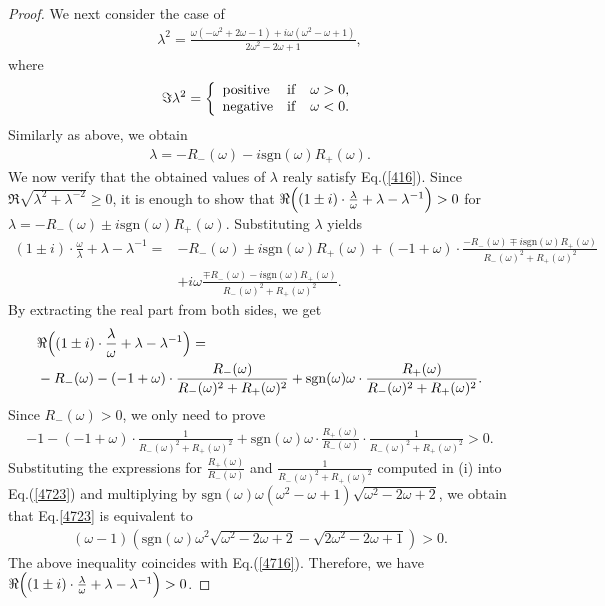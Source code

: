\documentclass[a4paper,12pt]{article}
\theoremstyle{plain}
\theoremstyle{definition}
\theoremstyle{definition}
\begin{document}
\begin{proof}
We next consider the case of 
\begin{align*}
\lambda ^2= \frac{\omega (-\omega ^2 +2\omega -1) + i\omega (\omega ^2 -\omega +1)}{2\omega ^2 -2\omega +1}, 
 \end{align*}
where 
\begin{eqnarray*}
\Im \lambda^2 = \left\{
\begin{array}{ll}
{\rm positive} &  {\rm if} \quad  \omega >0,\\
{\rm negative} & {\rm if} \quad \omega <0.
\end{array}
\right.
\end{eqnarray*}
Similarly as above, we obtain
\begin{align*}
    \lambda = -R_{-}(\omega)-i\mathrm{sgn}(\omega)R_{+}(\omega).
\end{align*}
We now verify that the obtained values of $\lambda$ realy satisfy Eq.(\ref{416}). Since $\Re \sqrt{\lambda^2 +\lambda^{-2}} \ge 0$, it is enough to show that $\Re \Bigl( (1\pm i) \cdot \frac{\lambda}{\omega}+\lambda -\lambda^{-1} \Bigr) > 0$ for $\lambda = -R_-(\omega) \pm i\mathrm{sgn}(\omega) R_+(\omega)$.
Substituting $\lambda$ yields
\begin{align*}
    (1 \pm i) \cdot \frac{\omega}{\lambda} +\lambda -\lambda^{-1} =& -R_{-}(\omega)\pm i\mathrm{sgn}(\omega)R_{+}(\omega)+(-1+\omega)\cdot \frac{-R_{-}(\omega)\mp i\mathrm{sgn}(\omega)R_{+}(\omega)}{R_-(\omega)^2+R_+(\omega)^2}\\
    &+i\omega\frac{\mp R_{-}(\omega)-i\mathrm{sgn}(\omega)R_{+}(\omega)}{R_-(\omega)^2+R_+(\omega)^2}.
\end{align*}
By extracting the real part from both sides, we get
\begin{align*}
    &\Re \Bigl( (1\pm i) \cdot \frac{\lambda}{\omega} +\lambda -\lambda^{-1} \Bigr) =\\
    &-R_-(\omega)-(-1+\omega)\cdot \frac{R_-(\omega)}{R_-(\omega)^2+R_+(\omega)^2}+\mathrm{sgn}(\omega)\omega\cdot  \frac{R_+(\omega)}{R_-(\omega)^2+R_+(\omega)^2}.
\end{align*}
Since $R_-(\omega)>0$, we only need to prove
\begin{align}
    -1-(-1+\omega)\cdot \frac{1}{R_-(\omega)^2+R_+(\omega)^2}+\mathrm{sgn}(\omega)\omega \cdot \frac{R_+(\omega)}{R_-(\omega)}\cdot  \frac{1}{R_-(\omega)^2+R_+(\omega)^2} > 0. \label{4723}
\end{align}
Substituting the expressions for $\frac{R_+(\omega)}{R_-(\omega)}$ and $\frac{1}{R_-(\omega)^2 + R_+(\omega)^2}$ computed in (i) into Eq.(\ref{4723}) and multiplying by 
$\mathrm{sgn}(\omega)\omega(\omega^2 - \omega + 1)\sqrt{\omega^2-2\omega+2}$,
we obtain that Eq.\eqref{4723} is equivalent to 
\begin{align*}
(\omega-1)(\mathrm{sgn}(\omega)\omega^2 \sqrt{\omega^2-2\omega +2} -\sqrt{2\omega^2-2\omega+1})>0.
\end{align*}
The above inequality coincides with Eq.(\ref{4716}). Therefore, we have $\Re \Bigl( (1 \pm i) \cdot \frac{\lambda}{\omega} +\lambda -\lambda^{-1} \Bigr) > 0$.
\end{proof}
\end{document}
